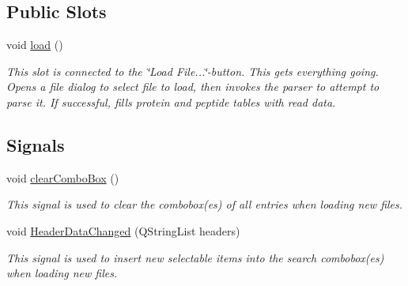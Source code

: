 \subsection*{Public Slots}
\begin{DoxyCompactItemize}
\item 
\mbox{\label{classmz_file_loader_acddd84704393e54d2e3c48e999a55b15}} 
void \mbox{\hyperlink{classmz_file_loader_acddd84704393e54d2e3c48e999a55b15}{load}} ()
\begin{DoxyCompactList}\small\item\em This slot is connected to the \char`\"{}\+Load File...\char`\"{}-\/button. This gets everything going. Opens a file dialog to select file to load, then invokes the parser to attempt to parse it. If successful, fills protein and peptide tables with read data. \end{DoxyCompactList}\end{DoxyCompactItemize}
\subsection*{Signals}
\begin{DoxyCompactItemize}
\item 
\mbox{\label{classmz_file_loader_ad2b2290c7dcf0859f02fd43bc75491a6}} 
void \mbox{\hyperlink{classmz_file_loader_ad2b2290c7dcf0859f02fd43bc75491a6}{clear\+Combo\+Box}} ()
\begin{DoxyCompactList}\small\item\em This signal is used to clear the combobox(es) of all entries when loading new files. \end{DoxyCompactList}\item 
void \mbox{\hyperlink{classmz_file_loader_ae659f02714e23607b981617155302f71}{Header\+Data\+Changed}} (Q\+String\+List headers)
\begin{DoxyCompactList}\small\item\em This signal is used to insert new selectable items into the search combobox(es) when loading new files. \end{DoxyCompactList}\end{DoxyCompactItemize}
